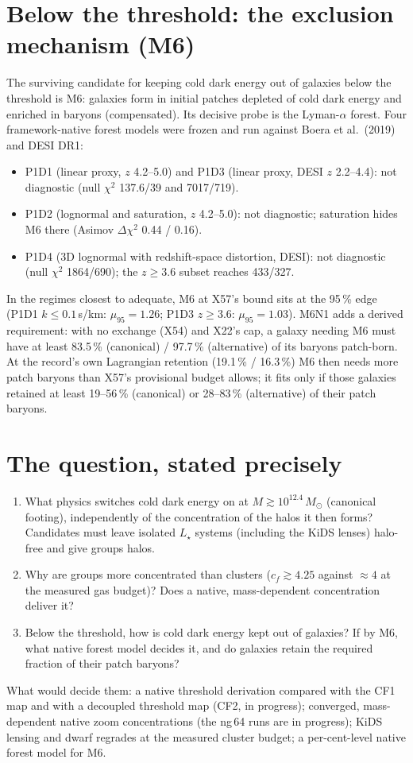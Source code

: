 \documentclass[10pt]{article}
\begin{document}
\section{Below the threshold: the exclusion mechanism (M6)}
The surviving candidate for keeping cold dark energy out of galaxies below the threshold is M6: galaxies form in initial patches depleted of cold dark energy and enriched in baryons (compensated). Its decisive probe is the Lyman-$\alpha$ forest. Four framework-native forest models were frozen and run against Boera et al.\ (2019) and DESI DR1:
\begin{itemize}
\item P1D1 (linear proxy, $z$ 4.2--5.0) and P1D3 (linear proxy, DESI $z$ 2.2--4.4): not diagnostic (null $\chi^2$ 137.6/39 and 7017/719).
\item P1D2 (lognormal and saturation, $z$ 4.2--5.0): not diagnostic; saturation hides M6 there (Asimov $\Delta\chi^2$ 0.44 / 0.16).
\item P1D4 (3D lognormal with redshift-space distortion, DESI): not diagnostic (null $\chi^2$ 1864/690); the $z\ge3.6$ subset reaches 433/327.
\end{itemize}
In the regimes closest to adequate, M6 at X57's bound sits at the 95\,\% edge (P1D1 $k\le0.1$\,s/km: $\mu_{95}=1.26$; P1D3 $z\ge3.6$: $\mu_{95}=1.03$). M6N1 adds a derived requirement: with no exchange (X54) and X22's cap, a galaxy needing M6 must have at least 83.5\,\% (canonical) / 97.7\,\% (alternative) of its baryons patch-born. At the record's own Lagrangian retention (19.1\,\% / 16.3\,\%) M6 then needs more patch baryons than X57's provisional budget allows; it fits only if those galaxies retained at least 19--56\,\% (canonical) or 28--83\,\% (alternative) of their patch baryons.

\section{The question, stated precisely}
\begin{enumerate}
\item What physics switches cold dark energy on at $M\gtrsim10^{12.4}\,M_\odot$ (canonical footing), independently of the concentration of the halos it then forms? Candidates must leave isolated $L_\star$ systems (including the KiDS lenses) halo-free and give groups halos.
\item Why are groups more concentrated than clusters ($c_f\gtrsim4.25$ against $\approx4$ at the measured gas budget)? Does a native, mass-dependent concentration deliver it?
\item Below the threshold, how is cold dark energy kept out of galaxies? If by M6, what native forest model decides it, and do galaxies retain the required fraction of their patch baryons?
\end{enumerate}
What would decide them: a native threshold derivation compared with the CF1 map and with a decoupled threshold map (CF2, in progress); converged, mass-dependent native zoom concentrations (the ng\,64 runs are in progress); KiDS lensing and dwarf regrades at the measured cluster budget; a per-cent-level native forest model for M6.
\end{document}
